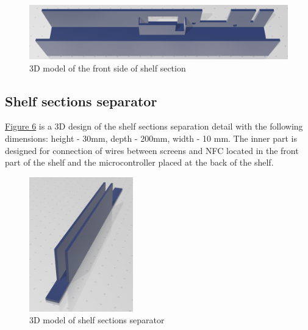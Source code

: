 \documentclass{article}
\begin{document}
\begin{figure}[H]
    \begin{center}
        \includegraphics[width=\textwidth]{3d/shelf-front.png}
    \end{center}
    \caption{3D model of the front side of shelf section}
    \label{fig:shelf-front}
\end{figure}

\subsection{Shelf sections separator}
\hyperref[fig:shelf-separator]{Figure 6} is a 3D design of the shelf sections separation detail with the following dimensions: height - 30mm, depth - 200mm, width - 10 mm. The inner part is designed for connection of wires between screens and NFC located in the front part of the shelf and the microcontroller placed at the back of the shelf.

\begin{figure}[H]
    \begin{center}
        \includegraphics[width=0.4\textwidth]{3d/separation.png}
    \end{center}
    \caption{3D model of shelf sections separator}
    \label{fig:shelf-separator}
\end{figure}
\end{document}
